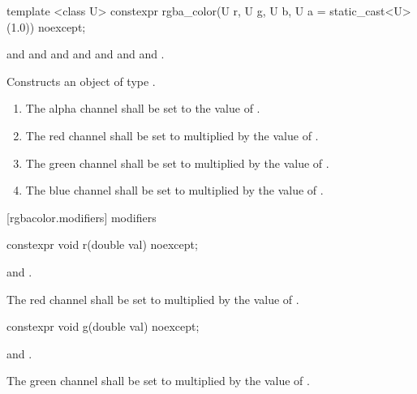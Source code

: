 \begin{itemdecl}
template <class U>
constexpr rgba_color(U r, U g, U b, U a = static_cast<U>(1.0)) noexcept;
\end{itemdecl}
\begin{itemdescr}
\pnum
\requires
{} and  and  and  and  and  and  and .

\pnum
\effects
Constructs an object of type .

\begin{enumerate}
\item The alpha channel shall be set to the value of .
\item The red channel shall be set to  multiplied by the value of  .
\item The green channel shall be set to  multiplied by the value of .
\item The blue channel shall be set to  multiplied by the value of .
\end{enumerate}
\end{itemdescr}


 [rgbacolor.modifiers]{ modifiers}

\begin{itemdecl}
constexpr void r(double val) noexcept;
\end{itemdecl}

\begin{itemdescr}
\pnum
\requires
{} and .

\pnum
\effects
The red channel shall be set to  multiplied by the value of  .
\end{itemdescr}

\begin{itemdecl}
constexpr void g(double val) noexcept;
\end{itemdecl}
\begin{itemdescr}
\pnum
\requires
{} and .

\pnum
\effects
The green channel shall be set to  multiplied by the value of  .
\end{itemdescr}

